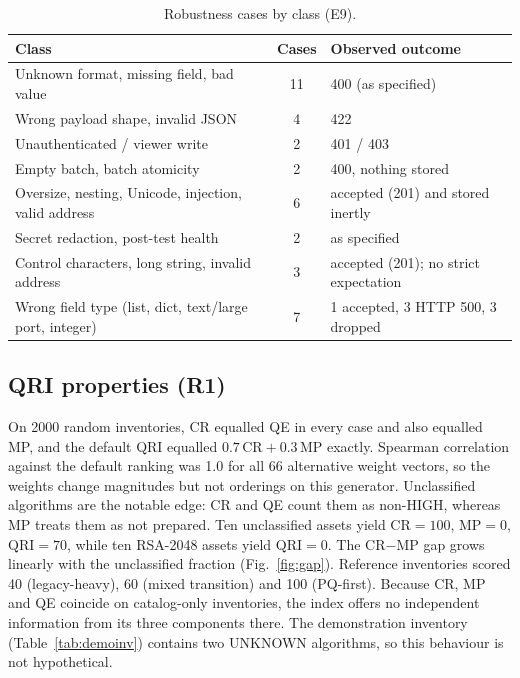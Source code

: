 \documentclass[conference]{IEEEtran}
\begin{document}
\begin{table}[t]
\caption{Robustness cases by class (E9).}
\label{tab:robust}
\centering
\scriptsize
\setlength{\tabcolsep}{3pt}
\begin{tabular}{@{}p{3.4cm} c p{3.0cm}@{}}
\toprule
Class & Cases & Observed outcome \\
\midrule
Unknown format, missing field, bad value & 11 & 400 (as specified) \\
Wrong payload shape, invalid JSON & 4 & 422 \\
Unauthenticated / viewer write & 2 & 401 / 403 \\
Empty batch, batch atomicity & 2 & 400, nothing stored \\
Oversize, nesting, Unicode, injection, valid address & 6 & accepted (201) and stored inertly \\
Secret redaction, post-test health & 2 & as specified \\
Control characters, long string, invalid address & 3 & accepted (201); no strict expectation \\
Wrong field type (list, dict, text/large port, integer) & 7 & 1 accepted, 3 HTTP 500, 3 dropped \\
\bottomrule
\end{tabular}
\end{table}

\subsection{QRI properties (R1)}
On 2000 random inventories, CR equalled QE in every case and also equalled MP, and the default QRI equalled $0.7\,\mathrm{CR}+0.3\,\mathrm{MP}$ exactly. Spearman correlation against the default ranking was 1.0 for all 66 alternative weight vectors, so the weights change magnitudes but not orderings on this generator. Unclassified algorithms are the notable edge: CR and QE count them as non-HIGH, whereas MP treats them as not prepared. Ten unclassified assets yield $\mathrm{CR}=100$, $\mathrm{MP}=0$, $\mathrm{QRI}=70$, while ten RSA-2048 assets yield $\mathrm{QRI}=0$. The CR$-$MP gap grows linearly with the unclassified fraction (Fig.~\ref{fig:gap}). Reference inventories scored 40 (legacy-heavy), 60 (mixed transition) and 100 (PQ-first). Because CR, MP and QE coincide on catalog-only inventories, the index offers no independent information from its three components there. The demonstration inventory (Table~\ref{tab:demoinv}) contains two UNKNOWN algorithms, so this behaviour is not hypothetical.
\end{document}
